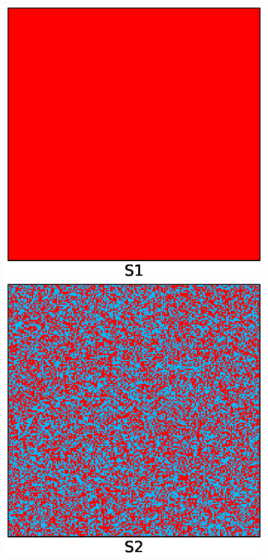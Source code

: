 \begin{figure}
    \begin{minipage}[c]{0.45\textwidth}
        \centering 
        \includegraphics[scale=0.45]{images/ising/mixing_S1_before}
    \end{minipage}
    \hfill
    \begin{minipage}[c]{0.45\textwidth}
        \centering 
        \includegraphics[scale=0.45]{images/ising/mixing_S2_before}

\end{minipage}
\end{figure}
